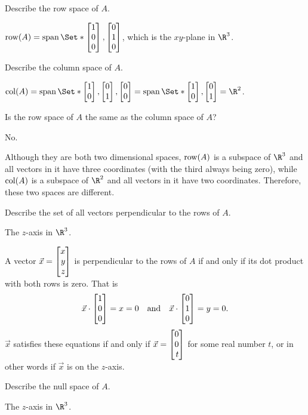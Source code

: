 \documentclass{problemset}
\begin{document}
	\begin{parts}
		\item Describe the row space of $A$.
			\begin{solution}
				$\Row(A) = \Span\Set*{\mat{1\\0\\0},\mat{0\\1\\0}}$,
				which is the $xy$-plane in $\R^3$.
			\end{solution}
		\item Describe the column space of $A$.
			\begin{solution}
				$\Col(A)=\Span\Set*{\mat{1\\0},\mat{0\\1},\mat{0\\0}}
					=\Span\Set*{\mat{1\\0},\mat{0\\1}}=\R^2$.
			\end{solution}
		\item Is the row space of $A$ the same as the column space of $A$?
			\begin{solution}
				No.

				Although they are both two dimensional spaces, $\operatorname{row}(A)$ is a
				subspace of $\R^3$ and all vectors in it have three coordinates
				(with the third always being zero), while $\operatorname{col}(A)$ is a
				subspace of $\R^2$ and all vectors in it have two coordinates.
				Therefore, these two spaces are different.
			\end{solution}
		\item Describe the set of all vectors perpendicular to the rows of $A$.
			\begin{solution}
				The $z$-axis in $\R^3$.

				A vector $\vec x=\mat{x\\y\\z}$ is perpendicular to the rows of $A$
				if and only if its dot product with both rows is zero. That is
				\[
					\vec x\cdot\mat{1\\0\\0} = x = 0
					\quad \text{and} \quad
					\vec x\cdot\mat{0\\1\\0} = y = 0.
				\]
				$\vec x$ satisfies these equations if and only if $\vec x=\mat{0\\0\\t}$
				for some real number $t$, or in other words if $\vec x$ is on the
				$z$-axis.
			\end{solution}
		\item Describe the null space of $A$.
			\begin{solution}
				The $z$-axis in $\R^3$.


\end{solution}
\end{parts}
\end{document}
